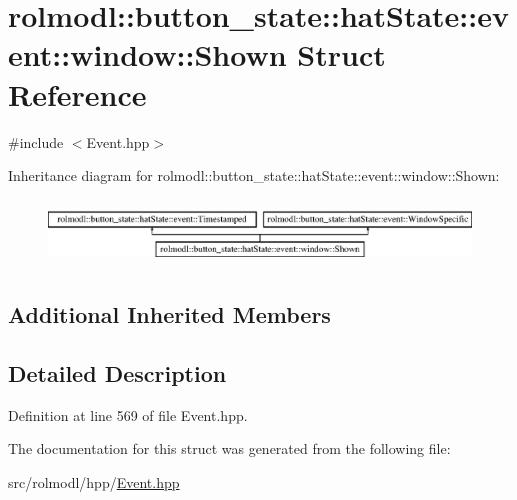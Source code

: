 \hypertarget{structrolmodl_1_1button__state_1_1hat_state_1_1event_1_1window_1_1_shown}{}\section{rolmodl\+::button\+\_\+state\+::hat\+State\+::event\+::window\+::Shown Struct Reference}
\label{structrolmodl_1_1button__state_1_1hat_state_1_1event_1_1window_1_1_shown}


{\ttfamily \#include $<$Event.\+hpp$>$}

Inheritance diagram for rolmodl\+::button\+\_\+state\+::hat\+State\+::event\+::window\+::Shown\+:\begin{figure}[H]
\begin{center}
\leavevmode
\includegraphics[height=1.761006cm]{structrolmodl_1_1button__state_1_1hat_state_1_1event_1_1window_1_1_shown}
\end{center}
\end{figure}
\subsection*{Additional Inherited Members}


\subsection{Detailed Description}


Definition at line 569 of file Event.\+hpp.



The documentation for this struct was generated from the following file\+:\begin{DoxyCompactItemize}
\item 
src/rolmodl/hpp/\mbox{\hyperlink{_event_8hpp}{Event.\+hpp}}\end{DoxyCompactItemize}
